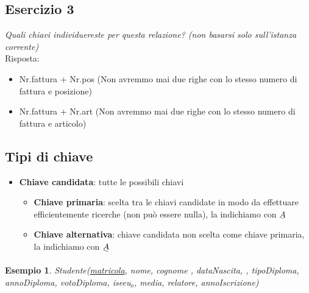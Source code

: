 \documentclass[12pt]{article}
\newtheorem{example}{Esempio}
\begin{document}
\subsection{Esercizio 3}
\begin{center}
\end{center}
\textit{Quali chiavi individuereste per questa relazione? (non basarsi solo sull'istanza corrente)}\\
Risposta:
\begin{itemize}
    \setlength\itemsep{0em} 
    \item Nr.fattura + Nr.pos (Non avremmo mai due righe con lo stesso numero di fattura e posizione)
    \item Nr.fattura + Nr.art (Non avremmo mai due righe con lo stesso numero di fattura e articolo)
\end{itemize}
\subsection{Tipi di chiave}
\begin{itemize}
    \setlength\itemsep{0em} 
    \item \textbf{Chiave candidata}: tutte le possibili chiavi
    \begin{itemize}
        \item \textbf{Chiave primaria}: scelta tra le chiavi candidate in modo da effettuare efficientemente ricerche (non può essere nulla), la indichiamo con \(\underline{A}\)
        \item \textbf{Chiave alternativa}: chiave candidata non scelta come chiave primaria, la indichiamo con \(\uwave{A}\)
    \end{itemize}
\end{itemize}
\begin{example}
    Studente(\uline{matricola}, nome, cognome , dataNascita, , tipoDiploma, annoDiploma, votoDiploma, iseeu\(_{o}\), media, relatore, annoIscrizione)
\end{example}
\end{document}
